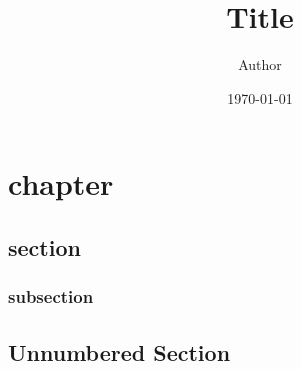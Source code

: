 \documentclass{book}
\title{Title}
\author{Author}
\date{\today}
\begin{document}
\maketitle

\tableofcontents

\chapter{chapter}

\section{section}

\lipsum[66]

\subsection{subsection}

\lipsum[75]

\section*{Unnumbered Section}

\lipsum[23]
\end{document}
